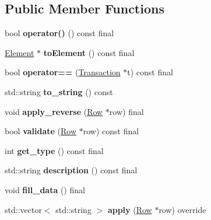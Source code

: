 \subsection*{Public Member Functions}
\begin{DoxyCompactItemize}
\item 
\mbox{\label{classReward_a1d04370c094170b0d166c341daa1644e}} 
bool {\bfseries operator()} () const final
\item 
\mbox{\label{classReward_a0ecd536148463880f9980fe415b6eb1d}} 
\mbox{\hyperlink{classElement}{Element}} $\ast$ {\bfseries to\+Element} () const final
\item 
\mbox{\label{classReward_ab2cd65f16c670e3e9d8cfe84a6dc56cb}} 
bool {\bfseries operator==} (\mbox{\hyperlink{classTransaction}{Transaction}} $\ast$t) const final
\item 
\mbox{\label{classReward_a0d65cd39eb260091d1f2cf19e2e71de7}} 
std\+::string {\bfseries to\+\_\+string} () const
\item 
\mbox{\label{classReward_a494c9d6e0a220729f675fd6131cfb9af}} 
void {\bfseries apply\+\_\+reverse} (\mbox{\hyperlink{classRow}{Row}} $\ast$row) final
\item 
\mbox{\label{classReward_a9c9a3219ba6b8b068f7f1cccc779b1b5}} 
bool {\bfseries validate} (\mbox{\hyperlink{classRow}{Row}} $\ast$row) const final
\item 
\mbox{\label{classReward_a1d3d05263d54771a314927d09585968c}} 
int {\bfseries get\+\_\+type} () const final
\item 
\mbox{\label{classReward_a95e98fc9dbbc9da47cee243adc1932d2}} 
std\+::string {\bfseries description} () const final
\item 
\mbox{\label{classReward_a30a40e2eefd0aea969fab46d1e22d145}} 
void {\bfseries fill\+\_\+data} () final
\item 
\mbox{\label{classReward_aae55ec2aa2aa31cc365c80cb42be9ab5}} 
std\+::vector$<$ std\+::string $>$ {\bfseries apply} (\mbox{\hyperlink{classRow}{Row}} $\ast$row) override

\end{DoxyCompactItemize}

